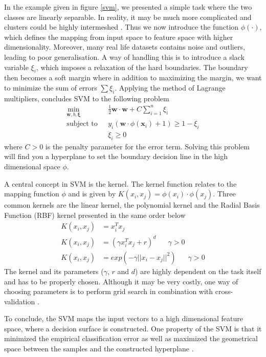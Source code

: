 In the example given in figure \ref{svm}, we presented a simple task where the two classes are linearly separable. In reality, it may be much more complicated and clusters could be highly intermeshed \citep{campbell2011}. Thus we now introduce the function $\phi(\cdot)$, which defines the mapping from input space to feature space with higher dimensionality. Moreover, many real life datasets contains noise and outliers, leading to poor generalisation. A way of handling this is to introduce a slack variable $\xi_i$, which imposes a relaxation of the hard boundaries. The boundary then becomes a soft margin where in addition to maximizing the margin, we want to minimize the sum of errors $\sum \xi_i$. Applying the method of Lagrange multipliers, \citet{campbell2011} concludes SVM to the following problem
\begin{align}
    \nonumber
    \min_{\bm{w},b,\bm{\xi}}\text{~~}&\frac{1}{2}\bm{w} \cdot \bm{w}+C\sum_{i=1}^{n} \xi_i \\ 
    \text{subject to~~}&y_i(\bm{w}\cdot \phi(\bm{x}_i)+1)\geq 1-\xi_i\\ 
    &\xi_i\geq 0 \nonumber
\end{align}
where $C>0$ is the penalty parameter for the error term. Solving this problem will find you a hyperplane to set the boundary decision line in the high dimensional space $\phi$.

A central concept in SVM is the kernel. The kernel function relates to the mapping function $\phi$ and is given by $K(x_i,x_j)=\phi(x_i)\cdot \phi(x_j)$. Three common kernels are the linear kernel, the polynomial kernel and the Radial Basis Function (RBF) kernel presented in the same order below
\begin{align}
K(x_i,x_j)&=x_i^Tx_j\\ \nonumber
K(x_i,x_j)&=(\gamma x_i^T x_j + r)^d \text{~~~~~}\gamma>0\\
K(x_i,x_j)&=exp(-\gamma ||x_i-x_j||^2) \text{~~~~~}\gamma>0 \nonumber
\end{align}
The kernel and its parameters ($\gamma$, $r$ and $d$) are highly dependent on the task itself and has to be properly chosen. Although it may be very costly, one way of choosing parameters is to perform grid search in combination with cross-validation \citep{Hsu10apractical}.

To conclude, the SVM maps the input vectors to a high dimensional feature space, where a decision surface is constructed. One property of the SVM is that it minimized the empirical classification error as well as maximized the geometrical space between the samples and the constructed hyperplane \citep{Cortes1995}.

